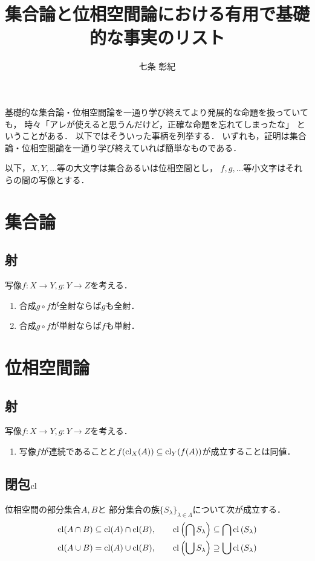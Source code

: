 \documentclass[a4paper]{jarticle}
\title{集合論と位相空間論における有用で基礎的な事実のリスト}
\author{七条 彰紀}
\begin{document}
\maketitle

基礎的な集合論・位相空間論を一通り学び終えてより発展的な命題を扱っていても，
時々「アレが使えると思うんだけど，正確な命題を忘れてしまったな」
ということがある．
以下ではそういった事柄を列挙する．
いずれも，証明は集合論・位相空間論を一通り学び終えていれば簡単なものである．

\begin{screen}
    以下，$X, Y, \dots$等の大文字は集合あるいは位相空間とし，
    $f,g,\dots$等小文字はそれらの間の写像とする．
\end{screen}

\section{集合論}
    \subsection{射}
    写像$f \colon X \to Y, g \colon Y \to Z$を考える．
    \begin{enumerate}
        \item 合成$g \circ f$が全射ならば$g$も全射．
        \item 合成$g \circ f$が単射ならば$f$も単射．
    \end{enumerate}

\section{位相空間論}
    \subsection{射}
    写像$f \colon X \to Y, g \colon Y \to Z$を考える．
    \begin{enumerate}
        \item 写像$f$が連続であることと$f(\operatorname{cl}_X(A)) \subseteq \operatorname{cl}_Y(f(A))$が成立することは同値．
    \end{enumerate}

    \subsection{閉包$\operatorname{cl}$}
    位相空間の部分集合$A, B$と
    部分集合の族$\{S_{\lambda}\}_{\lambda \in \Lambda}$について次が成立する．
    \begin{gather}
        \operatorname{cl}(A \cap B) \subseteq \operatorname{cl}(A) \cap \operatorname{cl}(B), \qquad
        \operatorname{cl} \left(\bigcap S_{\lambda}\right) \subseteq \bigcap \operatorname{cl} \left( S_{\lambda} \right) \\
        \operatorname{cl}(A \cup B) = \operatorname{cl}(A) \cup \operatorname{cl}(B), \qquad
        \operatorname{cl} \left( \bigcup S_{\lambda} \right) \supseteq \bigcup \operatorname{cl} \left( S_{\lambda} \right)
    \end{gather}
\end{document}

